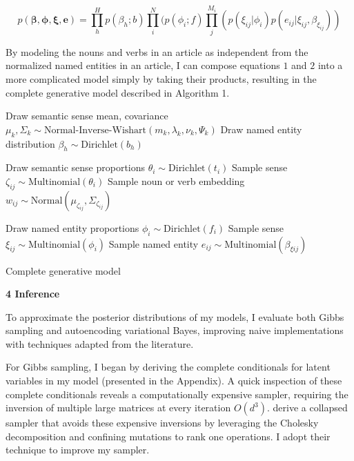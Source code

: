 \documentclass[12pt]{article}
\begin{document}
\begin{equation}
p(\bm{\beta}, \bm{\phi}, \bm{\xi}, \bm{e}) = \prod^{H}_{h} p(\beta_h; b)\prod^N_{i}(p(\phi_i; f)\prod^{M_i}_{j}(p(\xi_{ij} | \phi_i)p(e_{ij} | \xi_{ij}, \beta_{\xi_{ij}}))
\end{equation}

By modeling the nouns and verbs in an article as independent from the normalized named entities in an article, I can compose equations $1$ and $2$ into a more complicated model simply by taking their products, resulting in the complete generative model described in Algorithm 1.  

\begin{algorithm}[H]
\SetAlgoLined
{} {
 	Draw semantic sense mean, covariance $\mu_k, \Sigma_k \sim \text{Normal-Inverse-Wishart}(m_k, \lambda_k, \nu_k, \Psi_k)$\;
 }
  {
 	Draw named entity distribution $\beta_h \sim \text{Dirichlet}(b_h)$\;
 }
  {
 	Draw semantic sense proportions $\theta_i \sim \text{Dirichlet}(t_i)$\;
 	 {
		Sample sense $\zeta_{ij} \sim \text{Multinomial}(\theta_i)$\; 	
		Sample noun or verb embedding $w_{ij} \sim \text{Normal}(\mu_{\zeta_{ij}}, \Sigma_{\zeta_{ij}})$\;
 	}
 	
 	Draw named entity proportions $\phi_i \sim \text{Dirichlet}(f_i)$\;
 	 {
		Sample sense $\xi_{ij} \sim \text{Multinomial}(\phi_i)$\; 	
		Sample named entity $e_{ij} \sim \text{Multinomial}(\beta_{\xi{ij}})$\;
 	}
 }
 \caption{Complete generative model}
\end{algorithm}

\textbf{4 Inference}

To approximate the posterior distributions of my models, I evaluate both Gibbs sampling and autoencoding variational Bayes, improving naive implementations with techniques adapted from the literature.

For Gibbs sampling, I began by deriving the complete conditionals for latent variables in my model (presented in the Appendix).  A quick inspection of these complete conditionals reveals a computationally expensive sampler, requiring the inversion of multiple large matrices at every iteration $O(d^3)$.  \cite{das2015gaussian} derive a collapsed sampler that avoids these expensive inversions by leveraging the Cholesky decomposition and confining mutations to rank one operations.  I adopt their technique to improve my sampler.
\end{document}
